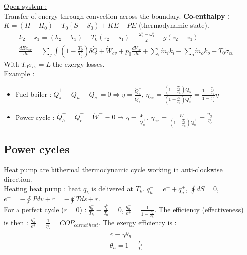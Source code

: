 \documentclass[../main.tex]{subfiles}
\begin{document}
\quad \underline{Open system :}\\
Transfer of energy through convection across the boundary. \textbf{Co-enthalpy :} $K = (H-H_0)-T_0(S-S_0)+KE+PE$ (thermodynamic state).\\
\begin{equation} \begin{gathered}k_2-k_1 = (h_2-h_1)-T_0 (s_2-s_1) + \frac{\omega_2^2-\omega_1^2}{2} + g(z_2-z_1)\\
\frac{dEx_{cv}}{dt} = \sum_j \int(1-\frac{T_0}{T_j}) \delta \dot{Q} + \dot{W}_{cv} + p_0 \frac{dV_{cv}}{dt}  + \sum_i \dot{m}_i k_i - \sum_o \dot{m}_o k_o - T_0 \dot{\sigma}_{cv}
\end{gathered}\end{equation}
With $T_0 \dot{\sigma}_{cv} = \dot{L}$ the exergy losses.\\

Example : \begin{itemize}
    \item Fuel boiler : $\dot{Q}_s^+ - \dot{Q}_u^- - \dot{Q}_a^- = 0 \Rightarrow \eta = \frac{\dot{Q}_u^-}{\dot{Q}_s^+}$, $\eta_{ex} = \frac{(1-\frac{T_0}{T_u}) \dot{Q}_u^-}{(1-\frac{T_0}{T_s})\dot{Q}_s^+} = \frac{1-\frac{T_0}{T_u}}{1-\frac{T_0}{T_s}} \eta$
    \item Power cycle : $\dot{Q}_h^+- \dot{Q}_c^- - \dot{W}^- = 0 \Rightarrow \eta = \frac{\dot{W}^-}{\dot{Q}_h^+}$, $\eta_{ex} = \frac{\dot{W}^-}{(1-\frac{T_0}{T_h}) \dot{Q}_h^+} = \frac{\eta_{th}}{\eta_c}$ 
\end{itemize}

\subsection{Power cycles}
Heat pump are bithermal thermodynamic cycle working in anti-clockwise direction. \\
Heating heat pump : heat $q_h$ is delivered at $T_h$. $q_h^- = e^+ + q_a^+$, $\oint dS = 0$, $e^+ = -\oint Pdv + r = -\oint Tds + r$.\\
For a perfect cycle ($r=0$) : $\frac{q_h^-}{T_h} - \frac{q_a^+}{T_a} = 0$, $\frac{q_h^-}{e^+} = \frac{1}{1-\frac{T_a}{T_h}}$. The efficiency (effectiveness) is then : $\frac{q_h^-}{e^+} = \frac{1}{\eta_c} = COP_{carnot\: heat}$. The exergy efficiency is : 
\begin{equation}\begin{gathered}
    \varepsilon = \eta \theta_h\\
    \theta_h = 1-\frac{T_h}{T_c}
    \end{gathered}
\end{equation}
\end{document}
